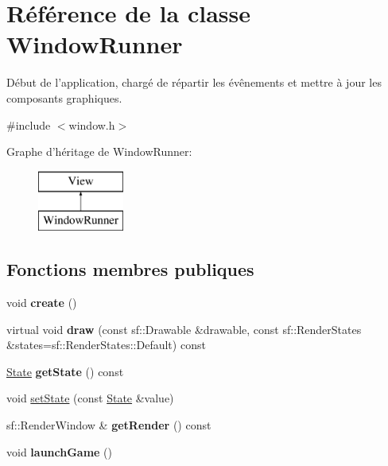 \hypertarget{class_window_runner}{\section{Référence de la classe Window\+Runner}
\label{class_window_runner}
}


Début de l'application, chargé de répartir les évênements et mettre à jour les composants graphiques.  




{\ttfamily \#include $<$window.\+h$>$}

Graphe d'héritage de Window\+Runner\+:\begin{figure}[H]
\begin{center}
\leavevmode
\includegraphics[height=2.000000cm]{class_window_runner}
\end{center}
\end{figure}
\subsection*{Fonctions membres publiques}
\begin{DoxyCompactItemize}
\item 
\hypertarget{class_window_runner_a5b7bc99d1b40c4661c134f12a9474301}{void {\bfseries create} ()}\label{class_window_runner_a5b7bc99d1b40c4661c134f12a9474301}

\item 
\hypertarget{class_window_runner_add3e284563a378e3e7942fa84a98bfbf}{virtual void {\bfseries draw} (const sf\+::\+Drawable \&drawable, const sf\+::\+Render\+States \&states=sf\+::\+Render\+States\+::\+Default) const }\label{class_window_runner_add3e284563a378e3e7942fa84a98bfbf}

\item 
\hypertarget{class_window_runner_a4d8b98152dc27e275759b431db4093b7}{\hyperlink{gamestate_8h_a5d74787dedbc4e11c1ab15bf487e61f8}{State} {\bfseries get\+State} () const }\label{class_window_runner_a4d8b98152dc27e275759b431db4093b7}

\item 
void \hyperlink{class_window_runner_a1acb98f35f5784c6620abbc71da6847b}{set\+State} (const \hyperlink{gamestate_8h_a5d74787dedbc4e11c1ab15bf487e61f8}{State} \&value)
\item 
\hypertarget{class_window_runner_aaf0c46901618e152f2fa803058286779}{sf\+::\+Render\+Window \& {\bfseries get\+Render} () const }\label{class_window_runner_aaf0c46901618e152f2fa803058286779}

\item 
\hypertarget{class_window_runner_a572fb0706838e095e265a52fd1fc7610}{void {\bfseries launch\+Game} ()}\label{class_window_runner_a572fb0706838e095e265a52fd1fc7610}

\end{DoxyCompactItemize}
